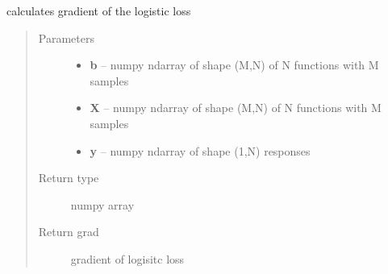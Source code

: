 \documentclass[letterpaper,10pt,english]{sphinxmanual}
\begin{document}
\begin{fulllineitems}
\label{regression:regression.logit_gradient}
calculates gradient of the logistic loss
\begin{quote}\begin{description}
\item[{Parameters}] \leavevmode\begin{itemize}
\item {} 
\textbf{b} -- numpy ndarray of shape (M,N) of N functions with M samples

\item {} 
\textbf{X} -- numpy ndarray of shape (M,N) of N functions with M samples

\item {} 
\textbf{y} -- numpy ndarray of shape (1,N) responses

\end{itemize}

\item[{Return type}] \leavevmode
numpy array

\item[{Return grad}] \leavevmode
gradient of logisitc loss

\end{description}\end{quote}

\end{fulllineitems}

\end{document}
